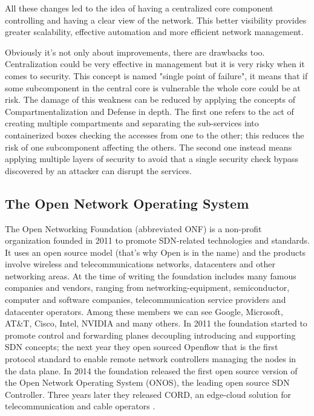 All these changes led to the idea of having a centralized core component controlling and having a clear view of the network. This better visibility provides greater scalability, effective automation and more efficient network management.

Obviously it's not only about improvements, there are drawbacks too. Centralization could be very effective in management but it is very risky when it comes to security. This concept is named "single point of failure", it means that if some subcomponent in the central core is vulnerable the whole core could be at risk. The damage of this weakness can be reduced by applying the concepts of Compartmentalization and Defense in depth. The first one refers to the act of creating multiple compartments and separating the sub-services into containerized boxes checking the accesses from one to the other; this reduces the risk of one subcomponent affecting the others. The second one instead means applying multiple layers of security to avoid that a single security check bypass discovered by an attacker can disrupt the services.


\subsection{The Open Network Operating System} 

The Open Networking Foundation (abbreviated ONF) is a non-profit organization founded in 2011 to promote SDN-related technologies and standards. It uses an open source model (that's why Open is in the name) and the products involve wireless and telecommunications networks, datacenters and other networking areas. At the time of writing the foundation includes many famous companies and vendors, ranging from networking-equipment, semiconductor, computer and software companies, telecommunication service providers and datacenter operators. Among these members we can see Google, Microsoft, AT\&T, Cisco, Intel, NVIDIA and many others. In 2011 the foundation started to promote control and forwarding planes decoupling introducing and supporting SDN concepts; the next year they open sourced Openflow that is the first protocol standard to enable remote network controllers managing the nodes in the data plane. In 2014 the foundation 
 released the first open source version of the Open Network Operating System (ONOS), the leading open source SDN Controller. Three years later they released CORD, an edge-cloud solution for telecommunication and cable operators \cite{opennetworking-org}.

